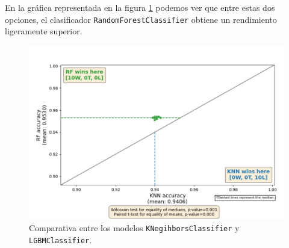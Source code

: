 \vspace{1em}

En la gráfica representada en la figura \ref{fig:vs_multi} podemos ver que entre estas dos opciones, el clasificador \texttt{RandomForestClassifier} obtiene un rendimiento ligeramente superior.

\begin{figure}[H]
	\centering
	\includegraphics[width=1\linewidth]{Imagenes/vs_multi}
	\caption[Comparativa entre los modelos \texttt{KNegihborsClassifier} y \texttt{LGBMClassifier}]{Comparativa entre los modelos \texttt{KNegihborsClassifier} y \texttt{LGBMClassifier}.}
	\label{fig:vs_multi}
\end{figure}
